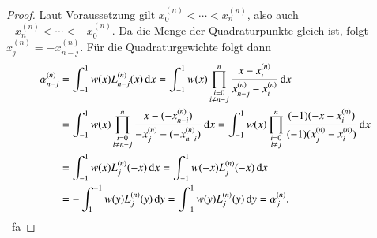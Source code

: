 \begin{proof}
  Laut Voraussetzung gilt $x_0^{(n)}< \cdots <x_n^{(n)}$, also auch $-x_n^{(n)}< \cdots < -x_0^{(n)}$.
  Da die Menge der Quadraturpunkte gleich ist, folgt $x_j^{(n)}=-x_{n-j}^{(n)}$. Für die Quadraturgewichte folgt dann
  \begin{equation*}
    \begin{split}
      \alpha_{n-j}^{(n)}
      &= \int_{-1}^1{w(x)L_{n-j}^{(n)}(x) \dif x}
      = \int_{-1}^1{w(x)\prod_{\substack{i=0 \\ i \neq n-j}}^n{\frac{x-x_i^{(n)}}{x_{n-j}^{(n)}-x_i^{(n)}}} \dif x} \\
      &= \int_{-1}^1{w(x)\prod_{\substack{i=0 \\ i \neq n-j}}^n{\frac{x-(-x_{n-i}^{(n)})}{-x_j^{(n)}-(-x_{n-i}^{(n)})}} \dif x}
      = \int_{-1}^1{w(x)\prod_{\substack{i=0 \\ i \neq j}}^n{\frac{(-1)(-x - x_i^{(n)})}{(-1)(x_j^{(n)}-x_i^{(n)})}} \dif x} \\
      &= \int_{-1}^1{w(x)L_j^{(n)}(-x) \dif x}
      = \int_{-1}^1{w(-x)L_j^{(n)}(-x) \dif x} \\
      &= -\int_1^{-1}{w(y)L_j^{(n)}(y) \dif y}
      = \int_{-1}^1{w(y)L_j^{(n)}(y) \dif y} = \alpha_j^{(n)}.\\
    \end{split}
  \end{equation*}
  \qedhere \ fa
\end{proof}
